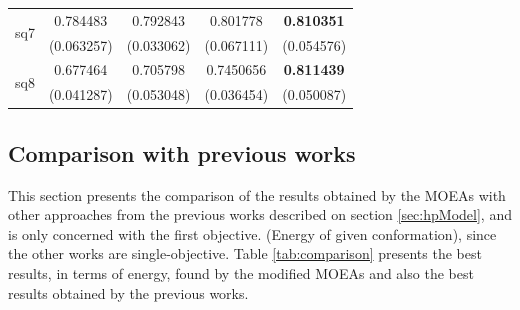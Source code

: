 \begin{table}[]
\begin{tabular}{|c|c|c|c|c|}
		\multirow{2}{*}{sq7}      & 0.784483          & 0.792843          & 0.801778                 & \textbf{0.810351}       \\
		& (0.063257)        & (0.033062)        & (0.067111)               & (0.054576)              \\ \hline
		\multirow{2}{*}{sq8}      & 0.677464          & 0.705798          & 0.7450656                & \cellcolor[HTML]{C0C0C0}\textbf{0.811439}       \\
		& (0.041287)        & (0.053048)        & (0.036454)               & \cellcolor[HTML]{C0C0C0}(0.050087)              \\ \hline
	\end{tabular}
\end{table}


\subsection{Comparison with previous works}	


This section presents the comparison of the results obtained by the MOEAs with other approaches from the previous works described on section \ref{sec:hpModel}, and is only concerned with the first objective. (Energy of given conformation), since the other works are single-objective. Table \ref{tab:comparison} presents the best results, in terms of energy, found by the modified MOEAs and also the best results obtained by the previous works.


